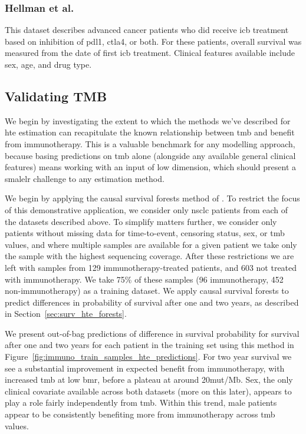 \documentclass[../thesis.tex]{subfiles}
\begin{document}
\subsubsection*{Hellman et al.}
This dataset describes advanced cancer patients who did receive \gls{icb} treatment based on inhibition of \gls{pdl1}, \gls{ctla4}, or both. For these patients, overall survival was measured from the date of first \gls{icb} treatment. Clinical features available include sex, age, and drug type.

\subsection{Validating TMB}
We begin by investigating the extent to which the methods we've described for \gls{hte} estimation can recapitulate the known relationship between \gls{tmb} and benefit from immunotherapy. This is a valuable benchmark for any modelling approach, because basing predictions on \gls{tmb} alone (alongside any available general clinical features) means working with an input of low dimension, which should present a smalelr challenge to any estimation method.

We begin by applying the causal survival forests method of \citet{cui_estimating_2022}. To restrict the focus of this demonstrative application, we consider only \gls{nsclc} patients from each of the datasets described above. To simplify matters further, we consider only patients without missing data for time-to-event, censoring status, sex, or \gls{tmb} values, and where multiple samples are available for a given patient we take only the sample with the highest sequencing coverage. After these restrictions we are left with samples from 129 immunotherapy-treated patients, and 603 not treated with immunotherapy. We take 75\% of these samples (96 immunotherapy, 452 non-immunotherapy) as a training dataset. We apply causal survival forests to predict differences in probability of survival after one and two years, as described in Section~\ref{sec:surv_hte_forests}.

We present out-of-bag predictions of difference in survival probability for survival after one and two years for each patient in the training set using this method in Figure~\ref{fig:immuno_train_samples_hte_predictions}. For two year survival we see a substantial improvement in expected benefit from immunotherapy, with increased \gls{tmb} at low \gls{bmr}, before a plateau at around 20mut/Mb. Sex, the only clinical covariate available across both datasets (more on this later), appears to play a role fairly independently from \gls{tmb}. Within this trend, male patients appear to be consistently benefiting more from immunotherapy across \gls{tmb} values.
\end{document}
